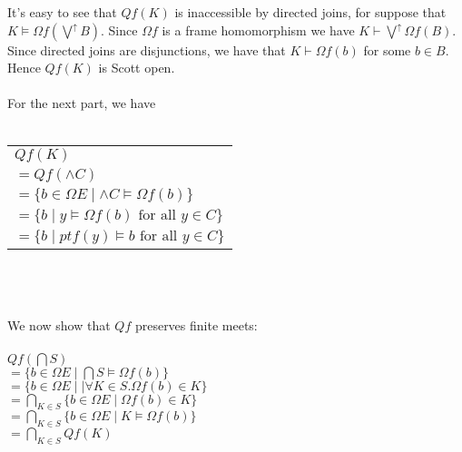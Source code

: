\documentclass{article}
\begin{document}
It's easy to see that $Qf(K)$ is inaccessible by directed joins, for suppose that $K \vDash \Omega f(\bigvee^{\uparrow} B)$. Since $\Omega f$ 
is a frame homomorphism we have $K \vdash \bigvee^{\uparrow} \Omega f(B)$. Since directed joins are disjunctions, we have that 
$K \vdash \Omega f(b)$ for some $b \in B$. Hence $Qf(K)$ is Scott open.\\~\\
For the next part, we have \\~\\
\begin{tabular}{l}
$Qf(K)$  \\
$= Qf( \wedge C )$ \\
$= \{ b \in \Omega E \mid \wedge C \vDash \Omega f(b) \}$ \\
$= \{ b \mid y \vDash \Omega f(b) \text{ for all } y \in C \}$ \\
$= \{ b \mid \mathit{pt} f(y) \vDash b \text{ for all } y \in C \}$  
\end{tabular}\\~\\~\\
We now show that $Qf$ preserves finite meets:~\\~\\
$Qf( \bigcap S )$\\
$= \{ b \in \Omega E \mid \bigcap S \vDash \Omega f(b) \}$ \\
$= \{ b \in \Omega E \mid \mid \forall K \in S. \Omega f(b) \in K \}$\\
$= \bigcap_{K \in S} \{ b \in \Omega E \mid \Omega f(b) \in K \}$\\
$= \bigcap_{K \in S} \{ b \in \Omega E \mid K \vDash \Omega f(b) \}$\\
$= \bigcap_{K \in S} Qf(K)$
\end{document}
